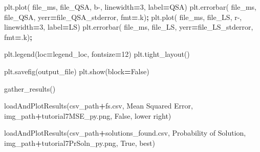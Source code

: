 \documentclass[12pt, twoside]{amherstthesis}
\newenvironment{Shaded}{\begin{snugshade}}{\end{snugshade}}
\newcommand{\DecValTok}[1]{\textcolor[rgb]{0.00,0.00,0.81}{#1}}
\newcommand{\NormalTok}[1]{#1}
\newcommand{\OperatorTok}[1]{\textcolor[rgb]{0.81,0.36,0.00}{\textbf{#1}}}
\newcommand{\StringTok}[1]{\textcolor[rgb]{0.31,0.60,0.02}{#1}}
\newcommand{\VariableTok}[1]{\textcolor[rgb]{0.00,0.00,0.00}{#1}}
\begin{document}
\begin{Shaded}
\begin{Highlighting}[]
\NormalTok{    plt.plot(     file\_ms, file\_QSA, }\StringTok{\textquotesingle{}b{-}\textquotesingle{}}\NormalTok{, linewidth}\OperatorTok{=}\DecValTok{3}\NormalTok{, label}\OperatorTok{=}\StringTok{\textquotesingle{}QSA\textquotesingle{}}\NormalTok{)}
\NormalTok{    plt.errorbar( file\_ms, file\_QSA, yerr}\OperatorTok{=}\NormalTok{file\_QSA\_stderror, fmt}\OperatorTok{=}\StringTok{\textquotesingle{}.k\textquotesingle{}}\NormalTok{)}\OperatorTok{;}
\NormalTok{    plt.plot(     file\_ms, file\_LS,  }\StringTok{\textquotesingle{}r{-}\textquotesingle{}}\NormalTok{, linewidth}\OperatorTok{=}\DecValTok{3}\NormalTok{, label}\OperatorTok{=}\StringTok{\textquotesingle{}LS\textquotesingle{}}\NormalTok{)}
\NormalTok{    plt.errorbar( file\_ms, file\_LS,  yerr}\OperatorTok{=}\NormalTok{file\_LS\_stderror, fmt}\OperatorTok{=}\StringTok{\textquotesingle{}.k\textquotesingle{}}\NormalTok{)}\OperatorTok{;}
    
\NormalTok{    plt.legend(loc}\OperatorTok{=}\NormalTok{legend\_loc, fontsize}\OperatorTok{=}\DecValTok{12}\NormalTok{)}
\NormalTok{    plt.tight\_layout()}

\NormalTok{    plt.savefig(output\_file)}
\NormalTok{    plt.show(block}\OperatorTok{=}\VariableTok{False}\NormalTok{)}
\end{Highlighting}
\end{Shaded}
\begin{Shaded}
\begin{Highlighting}[]
\NormalTok{gather\_results()}
\end{Highlighting}
\end{Shaded}
\begin{Shaded}
\begin{Highlighting}[]
\NormalTok{loadAndPlotResults(csv\_path}\OperatorTok{+}\StringTok{\textquotesingle{}fs.csv\textquotesingle{}}\NormalTok{, }
\StringTok{\textquotesingle{}Mean Squared Error\textquotesingle{}}\NormalTok{, }
\NormalTok{img\_path}\OperatorTok{+}\StringTok{\textquotesingle{}tutorial7MSE\_py.png\textquotesingle{}}\NormalTok{, }
\VariableTok{False}\NormalTok{, }
\StringTok{\textquotesingle{}lower right\textquotesingle{}}\NormalTok{)}
\end{Highlighting}
\end{Shaded}
\begin{Shaded}
\begin{Highlighting}[]
\NormalTok{loadAndPlotResults(csv\_path}\OperatorTok{+}\StringTok{\textquotesingle{}solutions\_found.csv\textquotesingle{}}\NormalTok{, }
\StringTok{\textquotesingle{}Probability of Solution\textquotesingle{}}\NormalTok{,   }
\NormalTok{img\_path}\OperatorTok{+}\StringTok{\textquotesingle{}tutorial7PrSoln\_py.png\textquotesingle{}}\NormalTok{,  }
\VariableTok{True}\NormalTok{,  }
\StringTok{\textquotesingle{}best\textquotesingle{}}\NormalTok{)}
\end{Highlighting}
\end{Shaded}
\end{document}
